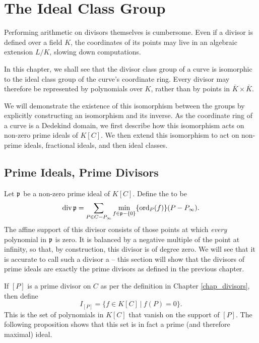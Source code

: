 
\section{The Ideal Class Group}
\label{chap_ideals}

Performing arithmetic on divisors themselves is cumbersome.
Even if a divisor is defined over a field $K$,
the coordinates of its points may live in an algebraic extension $L/K$,
slowing down computations.

In this chapter, we shall see that the divisor class group of a curve
is isomorphic to the ideal class group of the curve's coordinate ring.
Every divisor may therefore be represented by polynomials over $K$,
rather than by points in $\bar K \times \bar K$.

We will demonstrate the existence of this isomorphism between the groups
by explicitly constructing an isomorphism and its inverse.
As the coordinate ring of a curve is a Dedekind domain,
we first describe how this isomorphism acts on non-zero prime ideals of $K[C]$.
We then extend this isomorphism to act on non-prime ideals, fractional ideals, and then ideal classes.



\subsection{Prime Ideals, Prime Divisors}

Let $\frak p$ be a non-zero prime ideal of $K[C]$.
Define the  to be
  \[ \operatorname{div} \frak p = \sum_{P \in C - P_\infty} \min_{f \in \frak p - \{0\}}\{\operatorname{ord}_P(f)\}(P - P_\infty). \]
The affine support of this divisor consists of those points at which \emph{every} polynomial in $\frak p$ is zero.
It is balanced by a negative multiple of the point at infinity,
so that, by construction, this divisor is of degree zero.
We will see that it is accurate to call such a divisor a  --
this section will show that the divisors of prime ideals are exactly the prime divisors as defined in the previous chapter.

If $[P]$ is a prime divisor on $C$ as per the definition in Chapter \ref{chap_divisors}, then define
\[ I_{[P]} = \{ f \in K[C] ~|~ f(P) = 0 \}. \]
This is the set of polynomials in $K[C]$ that vanish on the support of $[P]$.
The following proposition shows that this set is in fact a prime (and therefore maximal) ideal.

